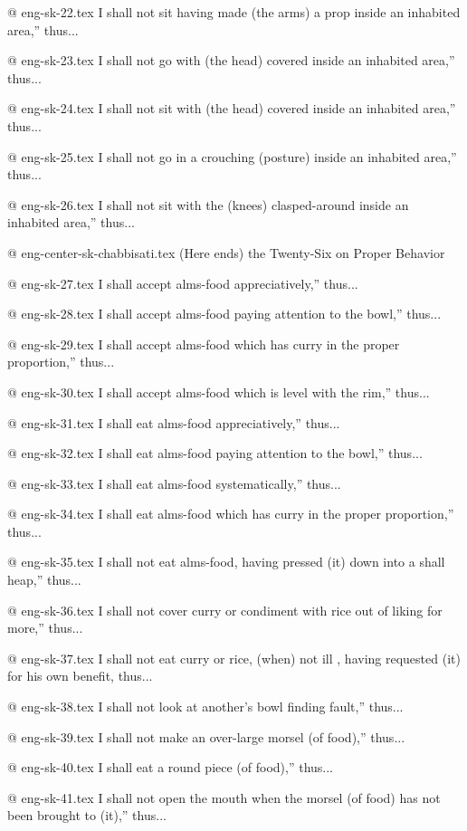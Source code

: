 @ eng-sk-22.tex
I shall not sit having made (the arms) a prop inside an inhabited area,” thus...

@ eng-sk-23.tex
I shall not go with (the head) covered inside an inhabited area,” thus...

@ eng-sk-24.tex
I shall not sit with (the head) covered inside an inhabited area,” thus...

@ eng-sk-25.tex
I shall not go in a crouching (posture) inside an inhabited area,” thus...

@ eng-sk-26.tex
I shall not sit with the (knees) clasped-around inside an inhabited area,” thus...

@ eng-center-sk-chabbisati.tex
(Here ends) the Twenty-Six on Proper Behavior

@ eng-sk-27.tex
I shall accept alms-food appreciatively,” thus...

@ eng-sk-28.tex
I shall accept alms-food paying attention to the bowl,” thus...

@ eng-sk-29.tex
I shall accept alms-food which has curry in the proper proportion,” thus...

@ eng-sk-30.tex
I shall accept alms-food which is level with the rim,” thus...

@ eng-sk-31.tex
I shall eat alms-food appreciatively,” thus...

@ eng-sk-32.tex
I shall eat alms-food paying attention to the bowl,” thus...

@ eng-sk-33.tex
I shall eat alms-food systematically,” thus...

@ eng-sk-34.tex
I shall eat alms-food which has curry in the proper proportion,” thus...

@ eng-sk-35.tex
I shall not eat alms-food, having pressed (it) down into a shall heap,” thus...

@ eng-sk-36.tex
I shall not cover curry or condiment with rice out of liking for more,” thus...

@ eng-sk-37.tex
I shall not eat curry or rice, (when) not ill , having requested (it) for his own benefit, thus...

@ eng-sk-38.tex
I shall not look at another's bowl finding fault,” thus...

@  eng-sk-39.tex
I shall not make an over-large morsel (of food),” thus...

@  eng-sk-40.tex
I shall eat a round piece (of food),” thus...

@  eng-sk-41.tex
I shall not open the mouth when the morsel (of food) has not been brought to (it),” thus...

